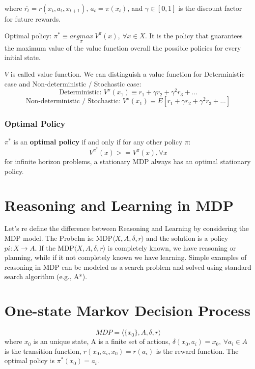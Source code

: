 where $\overline{r_{t}} = r(x_{t}, a_{t}, x_{t+1})$, $a_{t} = \pi(x_{t})$, and $\gamma \in [0, 1]$ is the discount factor for future rewards.

Optimal policy: $\pi^{*} \equiv \underset{\pi}{argmax}\ V^{\pi}(x),\ \forall x \in X$. It is the policy that guarantees the maximum value of the value function overall the possible policies for every initial state.

 $V$ is called value function. We can distinguish a value function for Deterministic case and Non-deterministic / Stochastic case:
 \begin{equation}
     \text{Deterministic: } V^{\pi}(x_{1}) \equiv r_{1} + \gamma r_{2} + \gamma^{2} r_{3} + \dots
 \end{equation}
  \begin{equation}
     \text{Non-deterministic / Stochastic: }V^{\pi}(x_{1}) \equiv E[r_{1} + \gamma r_{2} + \gamma^{2} r_{3} + \dots]
 \end{equation}

 \subsubsection{Optimal Policy}

 $\pi^{*}$ is an \textbf{optimal policy} if and only if for any other policy $\pi$:
 \begin{equation}
     V^{\pi^{*}}(x) >= V^{\pi}(x), \forall x
 \end{equation}
for infinite horizon problems, a stationary MDP always has an optimal stationary policy.

\section{Reasoning and Learning in MDP}

Let's re define the difference between Reasoning and Learning by considering the MDP model. The Probelm is: MDP$\langle X, A, \delta, r \rangle$ and the solution is a policy $pi: X \xrightarrow{} A$. If the MDP$\langle X, A, \delta, r \rangle$ is completely known, we have reasoning or planning, while if it not completely known we have learning. Simple examples of reasoning in MDP can be modeled as a search problem and solved using standard search algorithm (e.g., A*).

\section{One-state Markov Decision Process}
\begin{equation}
    MDP = \langle \{x_{0}\}, A, \delta, r \rangle
\end{equation}
where $x_{0}$ is an unique state, A is a finite set of actions, $\delta(x_{0}, a_{i}) = x_{0},\ \forall a_{i} \in A$ is the transition function, $r(x_{0}, a_{i}, x_{0}) = r(a_{i})$ is the reward function. The optimal policy is $\pi^{*}(x_{0}) = a_{i}$.

